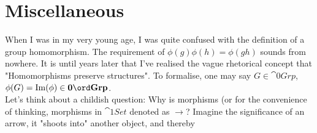 \section{Miscellaneous}

When I was in my very young age, I was quite confused with the definition of a group homomorphism. The requirement of \(\phi(g)\phi(h)=\phi(gh)\) sounds from nowhere. It is until years later that I've realised the vague rhetorical concept that "Homomorphisms preserve structures". To formalise, one may say \(G\in \cat{0}{Grp}\), \(\phi(G)=\oIm (\phi)\in \cat{0}{Grp}\). \\

Let's think about a childish question: Why is morphisms (or for the convenience of thinking, morphisms in \(\cat{1}{Set}\) denoted as \(\to\)? Imagine the significance of an arrow, it "shoots into" another object, and thereby 
